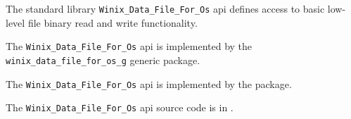 
The standard library {\tt Winix\_Data\_File\_For\_Os} api defines access to basic low-level 
file binary read and write functionality.

The {\tt Winix\_Data\_File\_For\_Os} api is implemented by the {\tt winix\_data\_file\_for\_os\_g} generic package.

The {\tt Winix\_Data\_File\_For\_Os} api is implemented by the  package.

The {\tt Winix\_Data\_File\_For\_Os} api source code is in .
